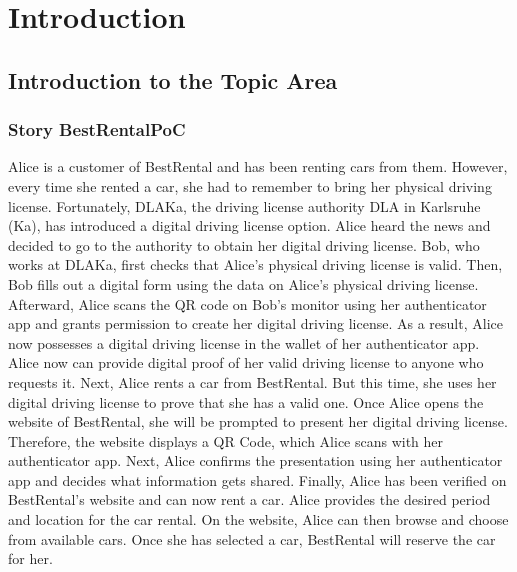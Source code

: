\chapter{Introduction}
\label{cha:introduction}



\section{Introduction to the Topic Area}

\subsection{Story BestRentalPoC}
\Gls{Alice} is a customer of \Gls{BestRental} and has been renting cars from them.
However, every time she rented a car, she had to remember to bring her physical driving license.
Fortunately, DLAKa, the driving license authority DLA in Karlsruhe (Ka), 
has introduced a digital driving license option. \Gls{Alice} heard the news and decided to go
to the authority to obtain her digital driving license. Bob, who works at DLAKa,
first checks that Alice's physical driving license is valid. Then, \Gls{Bob} fills out a digital form
using the data on Alice's physical driving license. Afterward, \Gls{Alice} scans the QR code on Bob's monitor
using her authenticator app and grants permission to create her digital driving license.
As a result, \Gls{Alice} now possesses a digital driving license in the wallet of her authenticator app.
\Gls{Alice} now can provide digital proof of her valid driving license to anyone who requests it.
Next, \Gls{Alice} rents a car from BestRental. But this time, she uses her digital driving license
to prove that she has a valid one. Once \Gls{Alice} opens the website of BestRental,
she will be prompted to present her digital driving license. Therefore, the website displays a QR Code,
which \Gls{Alice} scans with her authenticator app. Next, \Gls{Alice} confirms the presentation using
her authenticator app and decides what information gets shared. 
Finally, \Gls{Alice} has been verified on BestRental's website and can now rent a car. 
\Gls{Alice} provides the desired period and location for the car rental.
On the website, \Gls{Alice} can then browse and choose from available cars.
Once she has selected a car, \Gls{BestRental} will reserve the car for her.


